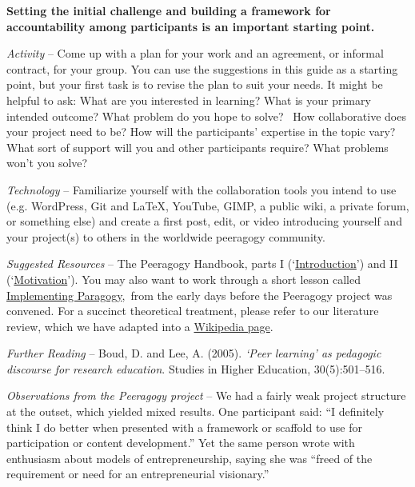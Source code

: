\textbf{Setting the initial challenge and building a framework for
accountability among participants is an important starting point.}

\emph{Activity} -- Come up with a plan for your work and an agreement,
or informal contract, for your group. You can use the suggestions in
this guide as a starting point, but your first task is to revise the
plan to suit your needs. It might be helpful to ask: What are you
interested in learning? What is your primary intended outcome? What
problem do you hope to solve? ~How collaborative does your project need
to be? How will the participants' expertise in the topic vary? What sort
of support will you and other participants require? What problems won't
you solve?

\emph{Technology} -- Familiarize yourself with the collaboration tools
you intend to use (e.g. WordPress, Git and LaTeX, YouTube, GIMP, a
public wiki, a private forum, or something else) and create a first
post, edit, or video introducing yourself and your project(s) to others
in the worldwide peeragogy community.

\emph{Suggested Resources} -- The Peeragogy Handbook, parts I
(`\href{http://peeragogy.org/}{Introduction}') and II
(`\href{http://peeragogy.org/motivation/}{Motivation}'). You may
also want to work through a short lesson called
\href{https://en.wikiversity.org/wiki/User:Arided/ImplementingParagogy}{Implementing
Paragogy},~from the early days before the Peeragogy project was
convened. For a succinct theoretical treatment, please refer to our
literature review, which we have adapted into a
\href{http://en.wikipedia.org/wiki/Peer_learning}{Wikipedia page}.

\emph{Further Reading} -- Boud, D. and Lee, A. (2005). \emph{`Peer
learning' as pedagogic discourse for research education}. Studies in
Higher Education, 30(5):501--516.

\emph{Observations from the Peeragogy project} -- We had a fairly weak
project structure at the outset, which yielded mixed results. One
participant said: ``I definitely think I do better when presented with a
framework or scaffold to use for participation or content development.''
Yet the same person wrote with enthusiasm about models of
entrepreneurship, saying she was ``freed of the requirement or need for
an entrepreneurial visionary.'' 

\noindent{}

